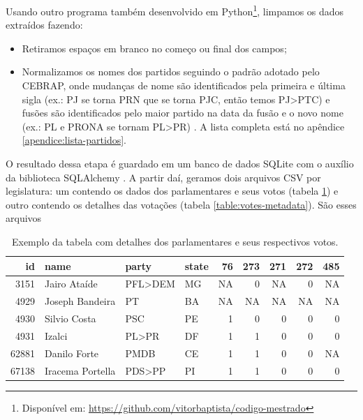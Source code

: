 \documentclass[a4paper,titlepage]{ppgi}\usepackage[]{graphicx}\usepackage[]{color}
\newenvironment{knitrout}{}{} %
\begin{document}
Usando outro programa também desenvolvido em Python\footnote{Disponível em:
\url{https://github.com/vitorbaptista/codigo-mestrado}}, limpamos os dados
extraídos fazendo:

\begin{itemize}
  \item Retiramos espaços em branco no começo ou final dos campos;
  \item Normalizamos os nomes dos partidos seguindo o padrão adotado pelo
\gls{CEBRAP}, onde mudanças de nome são identificados pela primeira e última
sigla (ex.: PJ se torna PRN que se torna PJC, então temos PJ>PTC) e fusões são
identificados pelo maior partido na data da fusão e o novo nome (ex.: PL e
PRONA se tornam PL>PR) \cite{Freitas2008}. A lista completa está no apêndice
\ref{apendice:lista-partidos}.
\end{itemize}

O resultado dessa etapa é guardado em um banco de dados SQLite com o auxílio da
biblioteca SQLAlchemy \cite{SQLite3,SQLAlchemy}. A partir daí, geramos dois
arquivos \gls{CSV} por legislatura: um contendo os dados dos parlamentares e
seus votos (tabela \ref{table:votes}) e outro contendo os detalhes das votações
(tabela \ref{table:votes-metadata}). São esses arquivos 

\begin{table}
\centering
\begin{knitrout}
\color{fgcolor}
\begin{tabular}{r|l|l|l|r|r|r|r|r}
\hline
id & name & party & state & 76 & 273 & 271 & 272 & 485\\
\hline
3151 & Jairo Ataíde & PFL>DEM & MG & NA & 0 & NA & 0 & NA\\
\hline
4929 & Joseph Bandeira & PT & BA & NA & NA & NA & NA & NA\\
\hline
4930 & Silvio Costa & PSC & PE & 1 & 0 & 0 & 0 & 0\\
\hline
4931 & Izalci & PL>PR & DF & 1 & 1 & 0 & 0 & 0\\
\hline
62881 & Danilo Forte & PMDB & CE & 1 & 1 & 0 & 0 & NA\\
\hline
67138 & Iracema Portella & PDS>PP & PI & 1 & 1 & 0 & 0 & 0\\
\hline
\end{tabular}


\end{knitrout}
\caption{Exemplo da tabela com detalhes dos parlamentares e seus respectivos votos.}
\label{table:votes}
\end{table}
\end{document}
